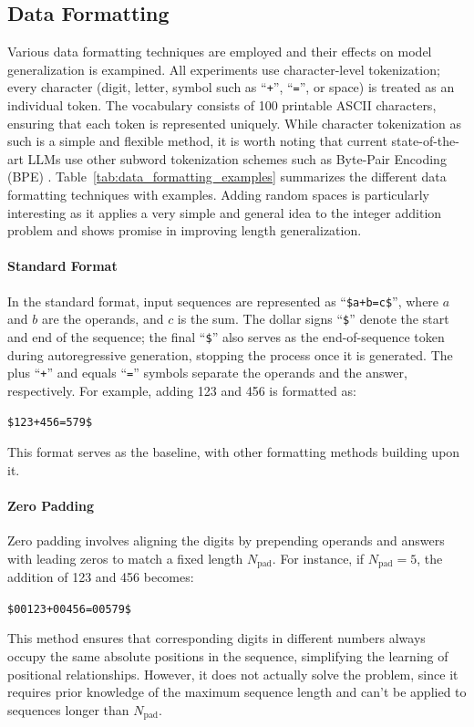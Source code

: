 \subsection{Data Formatting}\label{subsec:data_formatting}
Various data formatting techniques are employed and their effects on model generalization is exampined. All experiments use character-level tokenization; every character (digit, letter, symbol such as ``\texttt{+}'', ``\texttt{=}'', or space) is treated as an individual token. The vocabulary consists of 100 printable ASCII characters, ensuring that each token is represented uniquely. While character tokenization as such is a simple and flexible method, it is worth noting that current state-of-the-art LLMs use other subword tokenization schemes such as Byte-Pair Encoding (BPE) \parencite{sennrich_neural_2016,brown_language_2020}. Table~\ref{tab:data_formatting_examples} summarizes the different data formatting techniques with examples. Adding random spaces is particularly interesting as it applies a very simple and general idea to the integer addition problem and shows promise in improving length generalization.


\paragraph{Standard Format}
In the standard format, input sequences are represented as ``\verb|$a+b=c$|'', where $a$ and $b$ are the operands, and $c$ is the sum. The dollar signs ``\verb|$|'' denote the start and end of the sequence; the final ``\verb|$|'' also serves as the end-of-sequence token during autoregressive generation, stopping the process once it is generated. The plus ``\verb|+|'' and equals ``\verb|=|'' symbols separate the operands and the answer, respectively. For example, adding 123 and 456 is formatted as:
\begin{center}
  \verb|$123+456=579$|
\end{center}
This format serves as the baseline, with other formatting methods building upon it.

\paragraph{Zero Padding}
Zero padding involves aligning the digits by prepending operands and answers with leading zeros to match a fixed length $N_\text{pad}$. For instance, if $N_\text{pad}=5$, the addition of 123 and 456 becomes:
\begin{center}
  \verb|$00123+00456=00579$|
\end{center}
This method ensures that corresponding digits in different numbers always occupy the same absolute positions in the sequence, simplifying the learning of positional relationships. However, it does not actually solve the problem, since it requires prior knowledge of the maximum sequence length and can't be applied to sequences longer than $N_\text{pad}$.

